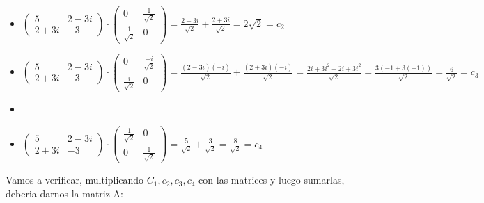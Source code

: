 \documentclass{report}
\begin{document}
\begin{enumerate}
\begin{enumerate}[label=\alph*)]
\begin{itemize}
    \item $\begin{pmatrix}
        5 &2-3i\\
        2+3i & -3
    \end{pmatrix}\cdot\begin{pmatrix}
       0& \frac{1}{\sqrt{2}} \\
        \frac{1}{\sqrt{2}} & 0
    \end{pmatrix}= \frac{2-3i}{\sqrt{2}}+\frac{2+3i}{\sqrt{2}}=2\sqrt{2}=c_2$
    
    \item $\begin{pmatrix}
        5 &2-3i\\
        2+3i & -3
    \end{pmatrix}\cdot\begin{pmatrix}
       0& \frac{-i}{\sqrt{2}} \\
        \frac{i}{\sqrt{2}} & 0
    \end{pmatrix}=\frac{(2-3i)(-i)}{\sqrt{2}}+\frac{(2+3i)(-i)}{\sqrt{2}}=\frac{2i+3i^2+2i+3i^2}{\sqrt{2}}=\frac{3(-1+3(-1))}{\sqrt{2}}=\frac{6}{\sqrt{2}}=c_3$
    
    \item \item $\begin{pmatrix}
        5 &2-3i\\
        2+3i & -3
    \end{pmatrix}\cdot\begin{pmatrix}
        \frac{1}{\sqrt{2}}& 0 \\
        0 & \frac{1}{\sqrt{2}}
    \end{pmatrix}= \frac{5}{\sqrt{2}}+\frac{3}{\sqrt{2}}=\frac{8}{\sqrt{2}}=c_4$
    \end{itemize}
    
    Vamos a verificar, multiplicando $C_1,c_2,c_3,c_4$ con las matrices y luego sumarlas, deberia darnos la matriz A:
    

\end{enumerate}
\end{enumerate}
\end{document}
